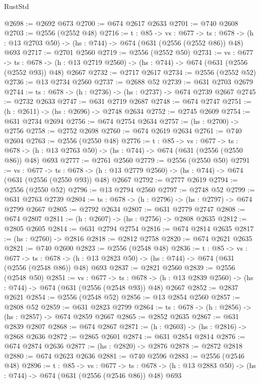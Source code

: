 \begin{lexlean}{RustStd}
\begin{coremodule}
@2698 := @2692 @673
@2700 := @674 @2617 @2633
@2701 := @740 @2608
@2703 := @2556 (@2552 @48)
@2716 := {t : @85} ->
  {vs : @677} ->
  {ts : @678} -> (h : @13 @2703 @50) -> (hs : @744) -> @674 (@631 (@2556 (@2552 @86)) @48) @693
@2717 := @2701 @2560
@2719 := @2556 (@2552 @50)
@2731 := {vs : @677} ->
  {ts : @678} -> (h : @13 @2719 @2560) -> (hs : @744) -> @674 (@631 (@2556 (@2552 @93)) @48) @2667
@2732 := @2717 @2617
@2734 := @2556 (@2552 @52)
@2736 := @13 @2734 @2560
@2737 := @2688 @52
@2739 := @631 @2703 @2679
@2744 := {ts : @678} -> (h : @2736) -> (hs : @2737) -> @674 @2739 @2667
@2745 := @2732 @2633
@2747 := @631 @2719 @2687
@2748 := @674 @2747
@2751 := (h : @2611) -> (hs : @2696) -> @2748 @2634
@2752 := @2745 @2609
@2754 := @631 @2734 @2694
@2756 := @674 @2754 @2634
@2757 := (hs : @2700) -> @2756
@2758 := @2752 @2698
@2760 := @674 @2619 @2634
@2761 := @740 @2604
@2763 := @2556 (@2550 @48)
@2776 := {t : @85} ->
  {vs : @677} ->
  {ts : @678} -> (h : @13 @2763 @50) -> (hs : @744) -> @674 (@631 (@2556 (@2550 @86)) @48) @693
@2777 := @2761 @2560
@2779 := @2556 (@2550 @50)
@2791 := {vs : @677} ->
  {ts : @678} -> (h : @13 @2779 @2560) -> (hs : @744) -> @674 (@631 (@2556 (@2550 @93)) @48) @2667
@2792 := @2777 @2619
@2794 := @2556 (@2550 @52)
@2796 := @13 @2794 @2560
@2797 := @2748 @52
@2799 := @631 @2763 @2739
@2804 := {ts : @678} -> (h : @2796) -> (hs : @2797) -> @674 @2799 @2667
@2805 := @2792 @2634
@2807 := @631 @2779 @2747
@2808 := @674 @2807
@2811 := (h : @2607) -> (hs : @2756) -> @2808 @2635
@2812 := @2805 @2605
@2814 := @631 @2794 @2754
@2816 := @674 @2814 @2635
@2817 := (hs : @2760) -> @2816
@2818 := @2812 @2758
@2820 := @674 @2621 @2635
@2821 := @740 @2600
@2823 := @2556 (@2548 @48)
@2836 := {t : @85} ->
  {vs : @677} ->
  {ts : @678} -> (h : @13 @2823 @50) -> (hs : @744) -> @674 (@631 (@2556 (@2548 @86)) @48) @693
@2837 := @2821 @2560
@2839 := @2556 (@2548 @50)
@2851 := {vs : @677} ->
  {ts : @678} -> (h : @13 @2839 @2560) -> (hs : @744) -> @674 (@631 (@2556 (@2548 @93)) @48) @2667
@2852 := @2837 @2621
@2854 := @2556 (@2548 @52)
@2856 := @13 @2854 @2560
@2857 := @2808 @52
@2859 := @631 @2823 @2799
@2864 := {ts : @678} -> (h : @2856) -> (hs : @2857) -> @674 @2859 @2667
@2865 := @2852 @2635
@2867 := @631 @2839 @2807
@2868 := @674 @2867
@2871 := (h : @2603) -> (hs : @2816) -> @2868 @2636
@2872 := @2865 @2601
@2874 := @631 @2854 @2814
@2876 := @674 @2874 @2636
@2877 := (hs : @2820) -> @2876
@2878 := @2872 @2818
@2880 := @674 @2623 @2636
@2881 := @740 @2596
@2883 := @2556 (@2546 @48)
@2896 := {t : @85} ->
  {vs : @677} ->
  {ts : @678} -> (h : @13 @2883 @50) -> (hs : @744) -> @674 (@631 (@2556 (@2546 @86)) @48) @693

\end{coremodule}
\end{lexlean}
